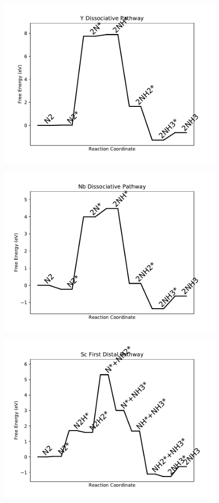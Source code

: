 \begin{figure}
\includegraphics[width=0.8\linewidth]{data/plots/Y_dissociative.pdf}
\end{figure}

\begin{figure}
\includegraphics[width=0.8\linewidth]{data/plots/Nb_dissociative.pdf}
\end{figure}

\begin{figure}
\includegraphics[width=0.8\linewidth]{data/plots/Sc_distal_1.pdf}
\end{figure}

